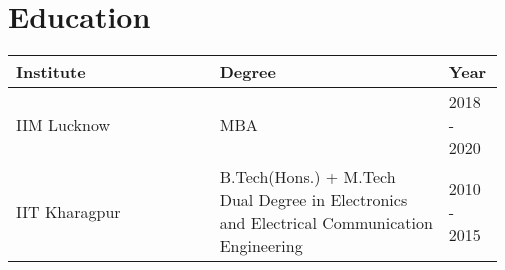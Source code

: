 \section{Education}
\raggedleft
\begin{tabularx}{.97\textwidth}{|>{\centering\arraybackslash}m{0.40\linewidth}|>{\centering\arraybackslash}m{0.45\linewidth}|>{\centering\arraybackslash}m{0.117\linewidth}|}
    \hline
    \rowcolor[gray]{0.9}
    \small Institute & \small Degree & \small Year \\
    \hline
    \small IIM Lucknow & \small MBA & \small 2018 - 2020 \\
    \hline
    \small IIT Kharagpur & \small B.Tech(Hons.) + M.Tech Dual Degree in Electronics and Electrical Communication Engineering & \small 2010 - 2015 \\
    \hline
\end{tabularx}
